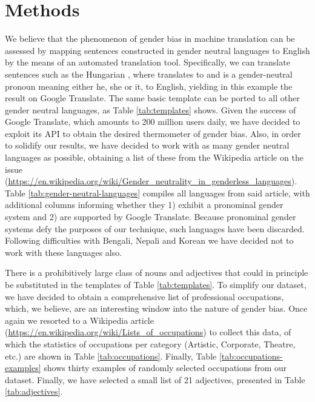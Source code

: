 \documentclass{article}
\begin{document}
\section{Methods}

We believe that the phenomenon of gender bias in machine translation can be assessed by mapping sentences constructed in gender neutral languages to English by the means of an automated translation tool. Specifically, we can translate sentences such as the Hungarian , where  translates to  and  is a gender-neutral pronoun meaning either he, she or it, to English, yielding in this example the result  on Google Translate. The same basic template can be ported to all other gender neutral languages, as Table \ref{tab:templates} shows. Given the success of Google Translate, which amounts to 200 million users daily, we have decided to exploit its API to obtain the desired thermometer of gender bias. Also, in order to solidify our results, we have decided to work with as many gender neutral languages as possible, obtaining a list of these from the Wikipedia article on the issue (\url{https://en.wikipedia.org/wiki/Gender_neutrality_in_genderless_languages}). Table \ref{tab:gender-neutral-languages} compiles all languages from said article, with additional columns informing whether they 1) exhibit a pronominal gender system and 2) are supported by Google Translate. Because pronominal gender systems defy the purposes of our technique, such languages have been discarded. Following difficulties with Bengali, Nepali and Korean we have decided not to work with these languages also.

There is a prohibitively large class of nouns and adjectives that could in principle be substituted in the templates of Table \ref{tab:templates}. To simplify our dataset, we have decided to obtain a comprehensive list of professional occupations, which, we believe, are an interesting window into the nature of gender bias. Once again we resorted to a Wikipedia article (\url{https://en.wikipedia.org/wiki/Lists_of_occupations}) to collect this data, of which the statistics of occupations per category (Artistic, Corporate, Theatre, etc.) are shown in Table \ref{tab:occupations}. Finally, Table \ref{tab:occupations-examples} shows thirty examples of randomly selected occupations from our dataset. Finally, we have selected a small list of 21 adjectives, presented in Table \ref{tab:adjectives}.
\end{document}
